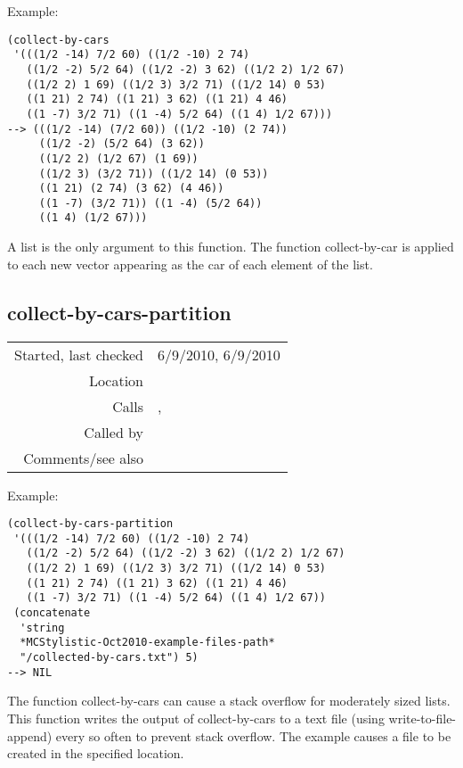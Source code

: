 \vspace{0.5cm}
\noindent Example:
\begin{verbatim}
(collect-by-cars
 '(((1/2 -14) 7/2 60) ((1/2 -10) 2 74)
   ((1/2 -2) 5/2 64) ((1/2 -2) 3 62) ((1/2 2) 1/2 67)
   ((1/2 2) 1 69) ((1/2 3) 3/2 71) ((1/2 14) 0 53)
   ((1 21) 2 74) ((1 21) 3 62) ((1 21) 4 46)
   ((1 -7) 3/2 71) ((1 -4) 5/2 64) ((1 4) 1/2 67)))
--> (((1/2 -14) (7/2 60)) ((1/2 -10) (2 74))
     ((1/2 -2) (5/2 64) (3 62))
     ((1/2 2) (1/2 67) (1 69))
     ((1/2 3) (3/2 71)) ((1/2 14) (0 53))
     ((1 21) (2 74) (3 62) (4 46))
     ((1 -7) (3/2 71)) ((1 -4) (5/2 64))
     ((1 4) (1/2 67)))
\end{verbatim}

\noindent A list is the only argument to this
function. The function collect-by-car is applied to
each new vector appearing as the car of each element
of the list.


\subsection*{collect-by-cars-partition}\label{fun:collect-by-cars-partition}

\vspace{0.3cm}
\begin{tabular}{r|p{8cm}}
Started, last checked & 6/9/2010, 6/9/2010 \\
Location & \nameref{sec:structural-induction-merge} \\
Calls & \nameref{fun:collect-by-cars}, \nameref{fun:write-to-file-append} \\
Called by & \nameref{fun:SIA-reflected-merge-sort} \\
Comments/see also &
\end{tabular}

\vspace{0.5cm}
\noindent Example:
\begin{verbatim}
(collect-by-cars-partition
 '(((1/2 -14) 7/2 60) ((1/2 -10) 2 74)
   ((1/2 -2) 5/2 64) ((1/2 -2) 3 62) ((1/2 2) 1/2 67)
   ((1/2 2) 1 69) ((1/2 3) 3/2 71) ((1/2 14) 0 53)
   ((1 21) 2 74) ((1 21) 3 62) ((1 21) 4 46)
   ((1 -7) 3/2 71) ((1 -4) 5/2 64) ((1 4) 1/2 67))
 (concatenate
  'string
  *MCStylistic-Oct2010-example-files-path*
  "/collected-by-cars.txt") 5)
--> NIL
\end{verbatim}

\noindent The function collect-by-cars can cause a
stack overflow for moderately sized lists. This
function writes the output of collect-by-cars to a
text file (using write-to-file-append) every so often
to prevent stack overflow. The example causes a file
to be created in the specified location.



